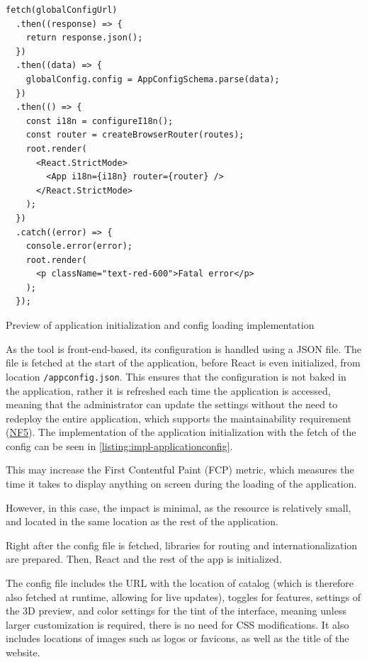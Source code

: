 \begin{listing}[h]
\begin{verbatim}
fetch(globalConfigUrl)
  .then((response) => {
    return response.json();
  })
  .then((data) => {
    globalConfig.config = AppConfigSchema.parse(data);
  })
  .then(() => {
    const i18n = configureI18n();
    const router = createBrowserRouter(routes);
    root.render(
      <React.StrictMode>
        <App i18n={i18n} router={router} />
      </React.StrictMode>
    );
  })
  .catch((error) => {
    console.error(error);
    root.render(
      <p className="text-red-600">Fatal error</p>
    );
  });
\end{verbatim}
\caption{Preview of application initialization and config loading implementation}
\label{listing:impl-applicationconfig}
\end{listing}

As the tool is front-end-based, its configuration is handled using a JSON file. The file is fetched at the start of the application, before React is even initialized, from location \texttt{/appconfig.json}. This ensures that the configuration is not baked in the application, rather it is refreshed each time the application is accessed, meaning that the administrator can update the settings without the need to redeploy the entire application, which supports the maintainability requirement (\hyperref[itm:NF5]{NF5}). The implementation of the application initialization with the fetch of the config can be seen in \autoref{listing:impl-applicationconfig}. 

This may increase the First Contentful Paint (FCP) metric, which measures the time it takes to display anything on screen during the loading of the application. \cite{Walton2023}

However, in this case, the impact is minimal, as the resource is relatively small, and located in the same location as the rest of the application.

Right after the config file is fetched, libraries for routing and internationalization are prepared. Then, React and the rest of the app is initialized. 

The config file includes the URL with the location of catalog (which is therefore also fetched at runtime, allowing for live updates), toggles for features, settings of the 3D preview, and color settings for the tint of the interface, meaning unless larger customization is required, there is no need for CSS modifications. It also includes locations of images such as logos or favicons, as well as the title of the website.


